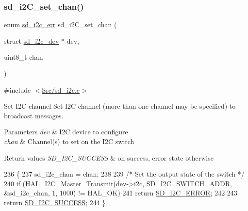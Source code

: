 \subsubsection{\texorpdfstring{sd\+\_\+i2\+C\+\_\+set\+\_\+chan()}{sd\_i2C\_set\_chan()}}
{\footnotesize\ttfamily enum \mbox{\hyperlink{group___s_d___i2_c___types_gae1e3131e61bdef08371262ffb4948a04}{sd\+\_\+i2c\+\_\+err}} sd\+\_\+i2\+C\+\_\+set\+\_\+chan (\begin{DoxyParamCaption}\item[{struct \mbox{\hyperlink{structsd__i2c__dev}{sd\+\_\+i2c\+\_\+dev}} $\ast$}]{dev,  }\item[{uint8\+\_\+t}]{chan }\end{DoxyParamCaption})}



{\ttfamily \#include $<$\mbox{\hyperlink{sd__i2c_8c}{Src/sd\+\_\+i2c.\+c}}$>$}



Set I2C channel Set I2C channel (more than one channel may be specified) to broadcast messages. 


\begin{DoxyParams}{Parameters}
{\em dev} & I2C device to configure \\
\hline
{\em chan} & Channel(s) to set on the I2C switch \\
\hline
\end{DoxyParams}

\begin{DoxyRetVals}{Return values}
{\em S\+D\+\_\+\+I2\+C\+\_\+\+S\+U\+C\+C\+E\+SS} & on success, error state otherwise \\
\hline
\end{DoxyRetVals}

\begin{DoxyCode}
236 \{
237     sd\_i2c\_chan = chan;
238     
239     \textcolor{comment}{/* Set the output state of the switch */}
240     \textcolor{keywordflow}{if} (HAL\_I2C\_Master\_Transmit(dev->\mbox{\hyperlink{structsd__i2c__dev_a23e125244a7e27ff9ccc31b3b8495cfe}{i2c}}, \mbox{\hyperlink{group___s_d___i2_c___defines_gacb76170cf42752cd56acf4d1221e57da}{SD\_I2C\_SWITCH\_ADDR}}, &sd\_i2c\_chan, 1, 1000) 
      != HAL\_OK)
241         \textcolor{keywordflow}{return} \mbox{\hyperlink{group___s_d___i2_c___types_ggae1e3131e61bdef08371262ffb4948a04a8c2d0ed2a4601d3eede97f9c09510bcf}{SD\_I2C\_ERROR}};
242 
243     \textcolor{keywordflow}{return} \mbox{\hyperlink{group___s_d___i2_c___types_ggae1e3131e61bdef08371262ffb4948a04a8ac753d592892daa8d2f9109c59b884b}{SD\_I2C\_SUCCESS}};
244 \}
\end{DoxyCode}
